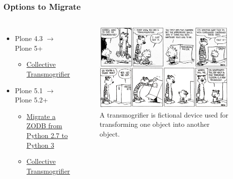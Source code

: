 \documentclass[aspectratio=169]{beamer}
\begin{document}
\begin{frame}
  \frametitle{Options to Migrate}

  \begin{columns}
    \begin{itemize}
      \item Plone 4.3 $\rightarrow$ Plone 5+
      \begin{itemize}
        \item \href{https://github.com/collective/collective.transmogrifier}{Collective Transmogrifier} \pause
      \end{itemize}
      \item Plone 5.1 $\rightarrow$ Plone 5.2+
      \begin{itemize}
        \item \href{https://docs.plone.org/manage/upgrading/version_specific_migration/upgrade_zodb_to_python3.html}{Migrate a ZODB from Python 2.7 to Python 3} \pause
        \item \href{https://github.com/collective/collective.transmogrifier}{Collective Transmogrifier} \pause
      \end{itemize}
    \end{itemize}
    \begin{figure}
      \includegraphics[height=.5\textheight]{./src/img/002_-_transmogrifier.png}
      \caption{A transmogrifier is fictional device used for transforming one object into another object.}
    \end{figure}
  \end{columns}


\end{frame}
\end{document}
